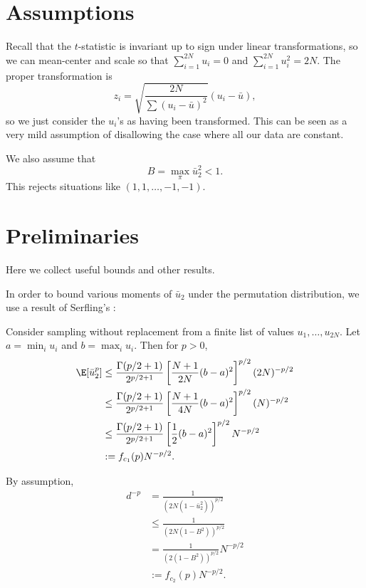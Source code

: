 \section{Assumptions}
Recall that the $t$-statistic is invariant up to sign under linear transformations, so we can
mean-center and scale so that $\sum_{i=1}^{2N} u_i = 0$ and $\sum_{i=1}^{2N} u_i^2 = 2N$.  The
proper transformation is 
\begin{equation}
  z_i = \sqrt{\frac{2N}{\sum (u_i - \bar{u})^2}}(u_i-\bar{u}), 
\end{equation}
so we just consider the $u_i$'s as having been transformed.  This can be seen as a very mild
assumption of disallowing the case where all our data are constant.  

We also assume that
\begin{equation}
  B = \max_{\pi} \bar{u}_2^2 < 1.
\end{equation}
This rejects situations like $(1, 1, \ldots, -1, -1)$.

\section{Preliminaries}
Here we collect useful bounds and other results.

In order to bound various moments of $\bar{u}_2$ under the permutation
distribution, we use a result of Serfling's
\cite{serfling1974probability}:
\begin{theorem}
  Consider sampling without replacement from a finite list of values
  $u_1, \ldots, u_{2N}$.  Let $a = \min_i u_i$ and $b = \max_i u_i$.
  Then for $p > 0$,
  \begin{align}
    \E [\bar{u}_2^p] 
    &\leq \frac{\Gamma(p/2 + 1)}{2^{p/2 + 1}}
    \left [ \frac{N+1}{2N}(b-a)^2 \right ]^{p/2}
    (2N)^{-p/2} \nonumber \\
    &\leq \frac{\Gamma(p/2 + 1)}{2^{p/2 + 1}}
    \left [ \frac{N+1}{4N}(b-a)^2 \right ]^{p/2}
    (N)^{-p/2} \nonumber \\
    &\leq \frac{\Gamma(p/2 + 1)}{2^{p/2 + 1}}
    \left [ \frac{1}{2}(b-a)^2 \right ]^{p/2}
    N^{-p/2} \nonumber \\
    &:= f_{c_1}(p)N^{-p/2} \label{def:serfling}.
  \end{align}
\end{theorem}

By assumption,
\begin{align}
  d^{-p} &= \frac{1}{(2N(1-\bar{u}_2^2))^{p/2}} \nonumber \\
  &\leq \frac{1}{(2N(1-B^2))^{p/2}} \nonumber \\
  &= \frac{1}{(2(1-B^2))^{p/2}}N^{-p/2} \nonumber \\
  &:= f_{c_2}(p) N^{-p/2} \label{def:dp}.
\end{align}

